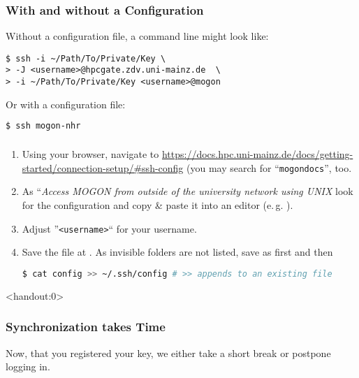 \begin{frame}[fragile]
	\frametitle{With and without a Configuration}
	Without a configuration file, a command line might look like:
	\begin{lstlisting}[style=Plain] 
$ ssh -i ~/Path/To/Private/Key \
> -J <username>@hpcgate.zdv.uni-mainz.de  \
> -i ~/Path/To/Private/Key <username>@mogon
	\end{lstlisting}
	\pause
	Or with a configuration file:
	\begin{lstlisting}[language=Bash, style=Shell]
$ ssh mogon-nhr
	\end{lstlisting}
\end{frame}

\setcounter{handson}{\value{preframe_handson}}
\begin{frame}[fragile]
	\setcounter{preframe_handson}{\value{handson}}
	\frametitle{}
	\begin{enumerate}[<+->]
		\item Using your browser, navigate to \url{https://docs.hpc.uni-mainz.de/docs/getting-started/connection-setup/#ssh-config} (you may search for ``\texttt{mogondocs}'', too.
		\item As ``\emph{\small Access MOGON from outside of the university network using UNIX} look for the configuration and copy \& paste it into an editor (e.\,g. ).
		\item Adjust ''\texttt{<username>}`` for your username.
		\item Save the file at \altverb{\~/.ssh/config}. As invisible folders are not listed, save as \altverb{config} first and then
		\begin{lstlisting}[language=Bash, style=Shell]
$ cat config >> ~/.ssh/config # >> appends to an existing file
		\end{lstlisting}
	\end{enumerate}
\end{frame}


\begin{frame}<handout:0>
	\frametitle{Synchronization takes Time}
	\begin{hint}
		Now, that you registered your key, we either take a short break or postpone logging in.
	\end{hint}
\end{frame}


